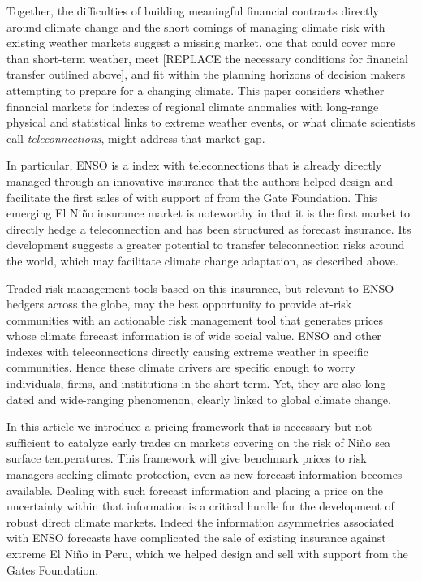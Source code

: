 \documentclass[authoryear]{article}
\begin{document}
Together, the difficulties of building meaningful financial contracts directly around climate change and the short comings of managing climate risk with existing weather markets suggest a missing market, one that could cover more than short-term weather, meet [REPLACE the necessary conditions for financial transfer outlined above], and fit within the planning horizons of decision makers attempting to prepare for a changing climate. This paper considers whether financial markets for indexes of regional climate anomalies with long-range physical and statistical links to extreme weather events, or what climate scientists call \emph{teleconnections}, might address that market gap.

In particular, ENSO is a index with teleconnections that is already directly managed through an innovative insurance that the authors helped design and facilitate the first sales of with support of from the Gate Foundation. This emerging El Ni\~no insurance market is noteworthy in that it is the first market to directly hedge a teleconnection and has been structured as forecast insurance. Its development suggests a greater potential to transfer teleconnection risks around the world, which may facilitate climate change adaptation, as described above.

Traded risk management tools based on this insurance, but relevant to ENSO hedgers across the globe, may the best opportunity to provide at-risk communities with an actionable risk management tool that generates prices whose climate forecast information is of wide social value. ENSO and other indexes with teleconnections directly causing extreme weather in specific communities. Hence these climate drivers are specific enough to worry individuals, firms, and institutions in the short-term. Yet, they are also long-dated and wide-ranging phenomenon, clearly linked to global climate change. 

In this article we introduce a pricing framework that is necessary but not sufficient to catalyze early trades on markets covering on the risk of Ni\~no sea surface temperatures. This framework will give benchmark prices to risk managers seeking climate protection, even as new forecast information becomes available. Dealing with such forecast information and placing a price on the uncertainty within that information is a critical hurdle for the development of robust direct climate markets. Indeed the information asymmetries associated with ENSO forecasts have complicated the sale of existing insurance against extreme El Ni\~no in Peru, which we helped design and sell with support from the Gates Foundation. 
\end{document}

